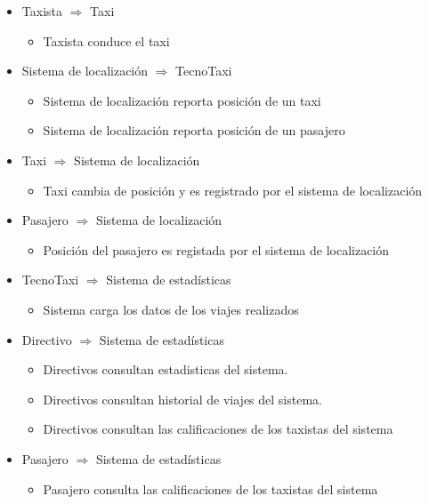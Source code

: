 \begin{itemize}
   \item Taxista $\Rightarrow$ Taxi 
    \begin{itemize}
         \item Taxista conduce el taxi
    \end{itemize}


    \item Sistema de localizaci\'on $\Rightarrow$ TecnoTaxi
    \begin{itemize}
        \item Sistema de localizaci\'on reporta posici\'on de un taxi
        \item Sistema de localizaci\'on reporta posici\'on de un pasajero
        
    \end{itemize}	
        \item Taxi $\Rightarrow$ Sistema de localizaci\'on
  		\begin{itemize}
        \item Taxi cambia de posici\'on y es registrado por el sistema de localizaci\'on
         \end{itemize}	

    \item Pasajero $\Rightarrow$ Sistema de localizaci\'on
    \begin{itemize}
        \item Posici\'on del pasajero es registada por el sistema de localizaci\'on
        \end{itemize}	


    \item TecnoTaxi $\Rightarrow$ Sistema de estad\'isticas
    
     \begin{itemize}
        \item Sistema carga los datos de los viajes realizados
    \end{itemize}	

    \item Directivo $\Rightarrow$ Sistema de estad\'isticas
    \begin{itemize}
        \item Directivos consultan estadisticas del sistema.
        \item Directivos consultan historial de viajes del sistema.
        \item Directivos consultan las calificaciones de los taxistas del sistema
    \end{itemize} 

     \item Pasajero $\Rightarrow$ Sistema de estad\'isticas
    \begin{itemize}
         \item Pasajero consulta las calificaciones de los taxistas del sistema
    \end{itemize}



\end{itemize}
